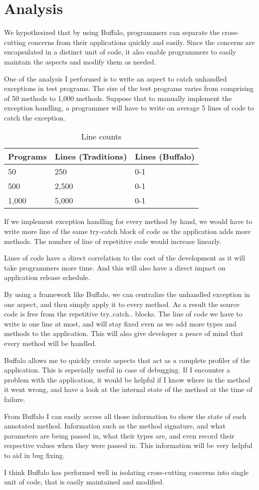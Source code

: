 \chapter{Analysis}

We hypothesized that by using Buffalo, programmers can separate the cross-cutting concerns from their applications quickly and easily. Since the concerns are encapsulated in a distinct unit of code, it also enable programmers to easily maintain the aspects and modify them as needed.

One of the analysis I performed is to write an aspect to catch unhandled exceptions in test programs. The size of the test programs varies from comprising of 50 methods to 1,000 methods. Suppose that to manually implement the exception handling, a programmer will have to write on average 5 lines of code to catch the exception.

\begin{table}[H]
\centering
\begin{tabular}{|l|l|l|}
\hline
Programs & Lines (Traditions) & Lines (Buffalo)\\
\hline
50 & 250 & 0-1\\
500 & 2,500 & 0-1\\
1,000 & 5,000 & 0-1\\
\hline
\end{tabular}
\caption{Line counts}
\label{tab:lines_tbl}
\end{table}

If we implement exception handling for every method by hand, we would have to write more line of the same try-catch block of code as the application adds more methods. The number of line of repetitive code would increase linearly.

Lines of code have a direct correlation to the cost of the development as it will take programmers more time. And this will also have a direct impact on application release schedule.

By using a framework like Buffalo, we can centralize the unhandled exception in one aspect, and then simply apply it to every method. As a result the source code is free from the repetitive try..catch.. blocks. The line of code we have to write is one line at most, and will stay fixed even as we add more types and methods to the application. This will also give developer a peace of mind that every method will be handled.

Buffalo allows me to quickly create aspects that act as a complete profiler of the application. This is especially useful in case of debugging. If I encounter a problem with the application, it would be helpful if I know where in the method it went wrong, and have a look at the internal state of the method at the time of failure.

From Buffalo I can easily access all those information to show the state of each annotated method. Information such as the method signature, and what parameters are being passed in, what their types are, and even record their respective values when they were passed in. This information will be very helpful to aid in bug fixing.

I think Buffalo has performed well in isolating cross-cutting concerns into single unit of code, that is easily maintained and modified.
